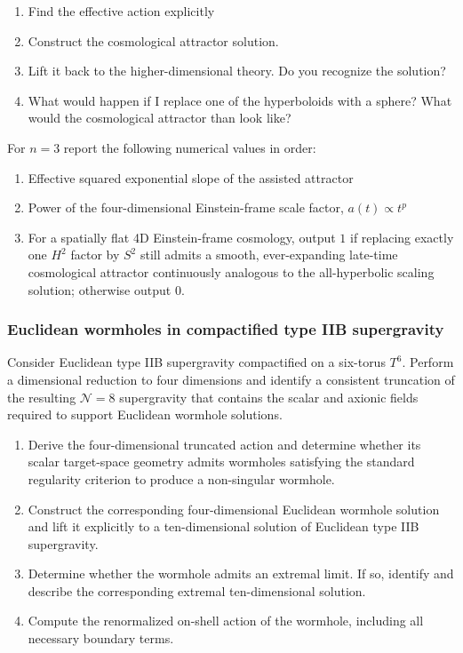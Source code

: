 \begin{enumerate}
    \item Find the effective action explicitly
    \item Construct the cosmological attractor solution. 
    \item Lift it back to the higher-dimensional theory. Do you recognize the solution?
    \item What would happen if I replace one of the hyperboloids with a sphere? What would the cosmological attractor than look like?
\end{enumerate}

For $n=3$ report the following numerical values in order:

\begin{enumerate}
    \item Effective squared exponential slope of the assisted attractor
    \item Power of the four-dimensional Einstein-frame scale factor, $a(t) \propto t^p$
    \item For a spatially flat 4D Einstein-frame cosmology, output $1$ if replacing exactly one $H^2$ factor by $S^2$ still admits a smooth, ever-expanding late-time cosmological attractor continuously analogous to the all-hyperbolic scaling solution; otherwise output $0$.
\end{enumerate}

\subsubsection{Euclidean wormholes in compactified type IIB supergravity}
\label{problem:iib-euclidean-wormholes}
Consider Euclidean type IIB supergravity compactified on a six-torus $T^6$. Perform a dimensional reduction to four dimensions and identify a consistent truncation of the resulting $\mathcal{N}=8$ supergravity that contains the scalar and axionic fields required to support Euclidean wormhole solutions.

\begin{enumerate}
\item Derive the four-dimensional truncated action and determine whether its scalar target-space geometry admits wormholes satisfying the standard regularity criterion to produce a non-singular wormhole.

\item Construct the corresponding four-dimensional Euclidean wormhole solution and lift it explicitly to a ten-dimensional solution of Euclidean type IIB supergravity.

\item Determine whether the wormhole admits an extremal limit. If so, identify and describe the corresponding extremal ten-dimensional solution.

\item Compute the renormalized on-shell action of the wormhole, including all necessary boundary terms.

\end{enumerate}

